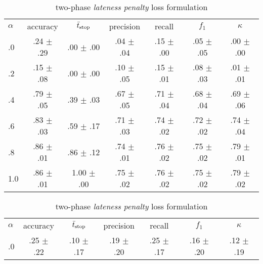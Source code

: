 
\begin{frame}


\begin{table}
	\caption{Varying the weighting factor $\alpha$ for the two loss formulations \emph{early reward} (\cref{sec:earlynessreward}) and \emph{lateness penalty} (\cref{sec:twophasecrossentropy}).}
	\label{tab:alpha}
	
	\setlength{\belowcaptionskip}{0pt}
	
	\begin{subtable}{.5\textwidth}
		\scriptsize
		\hspace{0em}\begin{tabular}{lcccccc}
			\toprule
			\textbf{$\alpha$} & accuracy & $\bar{t}_\text{stop}$ & precision & recall & $f_1$ & $\kappa$ \\
			\cmidrule(lr){0-0}\cmidrule(lr){1-1}\cmidrule(lr){2-2}\cmidrule(lr){3-3}\cmidrule(lr){4-4}\cmidrule(lr){5-5}\cmidrule(lr){6-6}\cmidrule(lr){7-7}
			.0 & .24 $\pm$ .29 & .00 $\pm$ .00 & .04 $\pm$ .04 & .15 $\pm$ .00 & .05 $\pm$ .05 & .00 $\pm$ .00 \\
			.2 & .15 $\pm$ .08 & .00 $\pm$ .00 & .10 $\pm$ .05 & .15 $\pm$ .01 & .08 $\pm$ .03 & .01 $\pm$ .01 \\
			.4 & .79 $\pm$ .05 & .39 $\pm$ .03 & .67 $\pm$ .05 & .71 $\pm$ .04 & .68 $\pm$ .04 & .69 $\pm$ .06 \\
			.6 & .83 $\pm$ .03 & .59 $\pm$ .17 & .71 $\pm$ .03 & .74 $\pm$ .02 & .72 $\pm$ .02 & .74 $\pm$ .04 \\
			.8 & .86 $\pm$ .01 & .86 $\pm$ .12 & .74 $\pm$ .01 & .76 $\pm$ .02 & .75 $\pm$ .02 & .79 $\pm$ .01 \\
			1.0 & .86 $\pm$ .01 & 1.00 $\pm$ .00 & .75 $\pm$ .02 & .76 $\pm$ .02 & .75 $\pm$ .02 & .79 $\pm$ .02 \\
			\bottomrule
		\end{tabular}
		\caption{two-phase \emph{lateness penalty} loss formulation}
		\label{tab:alpha:xentropy}
	\end{subtable}
	\begin{subtable}{.5\textwidth}
		\scriptsize
		\hspace{0em}\begin{tabular}{lcccccc}
			\toprule\small
			\textbf{$\alpha$} & accuracy & $\bar{t}_\text{stop}$  & precision & recall & $f_1$ & $\kappa$ \\
			\cmidrule(lr){0-0}\cmidrule(lr){1-1}\cmidrule(lr){2-2}\cmidrule(lr){3-3}\cmidrule(lr){4-4}\cmidrule(lr){5-5}\cmidrule(lr){6-6}\cmidrule(lr){7-7}
			.0 & .25 $\pm$ .22 & .10 $\pm$ .17 & .19 $\pm$ .20 & .25 $\pm$ .17 & .16 $\pm$ .20 & .12 $\pm$ .19 \\

\end{tabular}
\end{subtable}
\end{table}
\end{frame}
